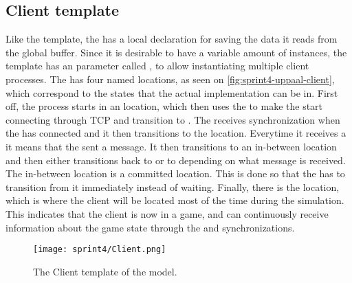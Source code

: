 \subsection*{Client template}
Like the  template, the  has a local declaration for saving the data it reads from the global buffer.
Since it is desirable to have a variable amount of instances, the template has an  parameter called , to allow instantiating multiple client processes.
The  has four named locations, as seen on \autoref{fig:sprint4-uppaal-client}, which correspond to the states that the actual implementation can be in.
First off, the process starts in an  location, which then uses the  to make the  start connecting through TCP and transition to .
The  receives  synchronization when the  has connected and it then transitions to the  location.
Everytime it receives a  it means that the  sent a message.
It then transitions to an in-between location and then either transitions back to  or to  depending on what message is received.
The in-between location is a committed location.
This is done so that the  has to transition from it immediately instead of waiting.
Finally, there is the  location, which is where the client will be located most of the time during the simulation. 
This indicates that the client is now in a game, and can continuously receive information about the game state through the  and  synchronizations.
\begin{figure}[h]
    \centering
    \texttt{[image: sprint4/Client.png]}
    \caption{The Client template of the \uppaal model.}
    \label{fig:sprint4-uppaal-client}
\end{figure}

